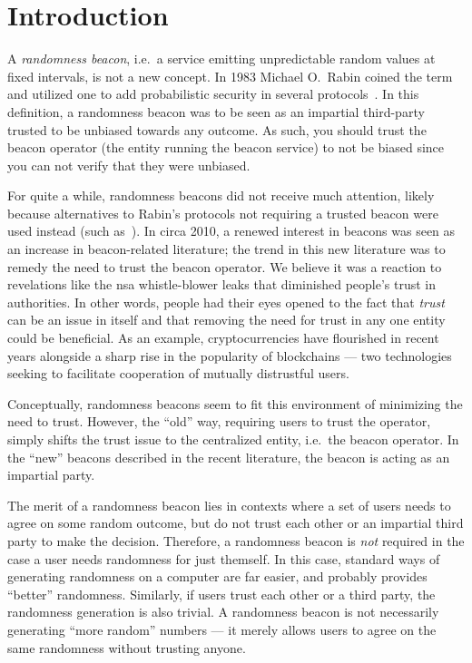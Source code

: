 \section{Introduction}
A \emph{randomness beacon}, i.e.\ a service emitting unpredictable random values at fixed intervals, is not a new concept.
In 1983 Michael O.\ Rabin coined the term and utilized one to add probabilistic security in several protocols~\cite{rabin1983transaction}.
In this definition, a randomness beacon was to be seen as an impartial third-party trusted to be unbiased towards any outcome.
As such, you should trust the beacon operator (the entity running the beacon service) to not be biased since you can not verify that they were unbiased.

For quite a while, randomness beacons did not receive much attention, likely because alternatives to Rabin's protocols not requiring a trusted beacon were used instead (such as~\cite{BGMR}).
In circa 2010, a renewed interest in beacons was seen as an increase in beacon-related literature; the trend in this new literature was to remedy the need to trust the beacon operator.
We believe it was a reaction to revelations like the \gls{nsa} whistle-blower leaks that diminished people's trust in authorities.
In other words, people had their eyes opened to the fact that \emph{trust} can be an issue in itself and that removing the need for trust in any one entity could be beneficial.
As an example, cryptocurrencies have flourished in recent years alongside a sharp rise in the popularity of blockchains --- two technologies seeking to facilitate cooperation of mutually distrustful users.

Conceptually, randomness beacons seem to fit this environment of minimizing the need to trust.
However, the \enquote{old} way, requiring users to trust the operator, simply shifts the trust issue to the centralized entity, i.e.\ the beacon operator.
In the \enquote{new} beacons described in the recent literature, the beacon is acting as an impartial party.

The merit of a randomness beacon lies in contexts where a set of users needs to agree on some random outcome, but do not trust each other or an impartial third party to make the decision.
Therefore, a randomness beacon is \emph{not} required in the case a user needs randomness for just themself. In this case, standard ways of generating randomness on a computer are far easier, and probably provides \enquote{better} randomness.
Similarly, if users trust each other or a third party, the randomness generation is also trivial.
A randomness beacon is not necessarily generating \enquote{more random} numbers --- it merely allows users to agree on the same randomness without trusting anyone.

